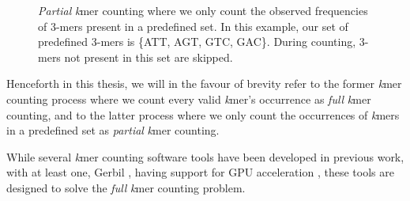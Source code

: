 \begin{figure}[H]
\begin{center}
{
}
\caption{
  \textit{Partial} \textit{k}mer counting where we only count the observed frequencies of 3-mers present in a predefined set. In this example, our set of predefined 3-mers is \{ATT, AGT, GTC, GAC\}. During counting, 3-mers not present in this set are skipped.
}
\label{background:kmers_and_kmer_counting:partial_kmer_counting:figure}
\end{center}
\end{figure}

Henceforth in this thesis, we will in the favour of brevity refer to the former \textit{k}mer counting process where we count every valid \textit{k}mer's occurrence as \textit{full} \textit{k}mer counting, and to the latter process where we only count the occurrences of \textit{k}mers in a predefined set as \textit{partial} \textit{k}mer counting.

While several \textit{k}mer counting software tools have been developed in previous work, with at least one, Gerbil \cite{gerbil}, having support for GPU acceleration \cite{kmer_counting_tools}, these tools are designed to solve the \textit{full} \textit{k}mer counting problem.
